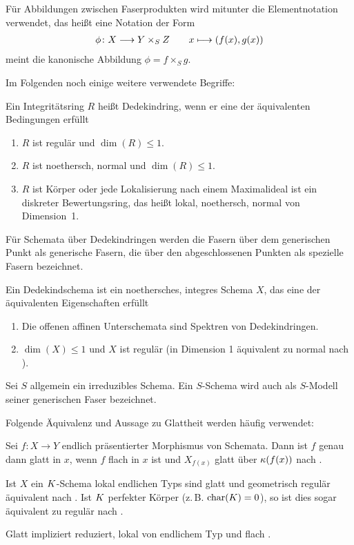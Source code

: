 Für Abbildungen zwischen Faserprodukten wird mitunter die
Elementnotation verwendet, das heißt eine Notation der Form
\begin{gather*}
  \phi\colon X\longrightarrow Y\times_S Z\qquad
  x\longmapsto (f(x),g(x))
\end{gather*}
meint die kanonische Abbildung $\phi=f\times_S g$.

Im Folgenden noch einige weitere verwendete Begriffe:
\begin{Definition}[Dedekindring]\label{def:dedekindring}
  Ein Integritätsring $R$ heißt Dedekindring, wenn er eine der
  äquivalenten Bedingungen erfüllt
  \begin{enumerate}[label=(\roman*)]
  \item $R$ ist regulär und $\dim(R)\leq 1$.
  \item $R$ ist noethersch, normal und $\dim(R)\leq 1$.
  \item $R$ ist Körper oder
    jede Lokalisierung nach einem Maximalideal ist ein diskreter
    Bewertungsring,
    das heißt lokal, noethersch, normal von Dimension~1.
  \end{enumerate}
\end{Definition}
Für Schemata über Dedekindringen werden die Fasern über dem
generischen Punkt als generische Fasern, die über den abgeschlossenen
Punkten als spezielle Fasern bezeichnet.
\begin{Definition}[Dedekindschema]
  Ein Dedekindschema ist ein noethersches, integres Schema $X$, das
  eine der äquivalenten Eigenschaften erfüllt
  \begin{enumerate}[label=(\roman*)]
  \item Die offenen affinen Unterschemata sind Spektren von Dedekindringen.
  \item $\dim(X)\leq 1$ und $X$ ist regulär
    (in Dimension 1 äquivalent zu normal nach
    \cite[Corollary~6.39, Proposition~6.40]{wedhorn}).
  \end{enumerate}
\end{Definition}
Sei $S$ allgemein ein irreduzibles Schema. Ein $S$-Schema wird auch als
$S$-Modell seiner generischen Faser bezeichnet.

Folgende Äquivalenz und Aussage zu Glattheit werden häufig verwendet:
\begin{Bemerkung}\label{thm:eigglatt}
  Sei $f\colon X\to Y$ endlich präsentierter Morphismus von Schemata.
  Dann ist $f$ genau dann glatt in $x$, wenn $f$ flach in $x$ ist und
  $X_{f(x)}$ glatt über $\kappa(f(x))$ nach
  \cite[Proposition~8.5/17]{bosch}.
  
  Ist $X$ ein $K$-Schema lokal endlichen Typs sind glatt und
  geometrisch regulär äquivalent nach \cite[Corollary~6.32]{wedhorn}.
  Ist $K$ perfekter Körper (z.\,B. $\operatorname{char}(K)=0$), so ist dies sogar
  äquivalent zu regulär nach \cite[Remark~6.33]{wedhorn}.
    
  Glatt impliziert reduziert, lokal von endlichem Typ und flach
  \cite[für flach siehe][Theorem~14.22]{wedhorn}.
\end{Bemerkung}

